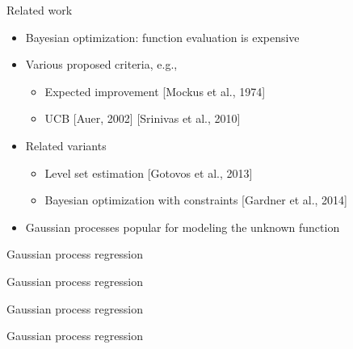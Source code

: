 \documentclass[xetex,10pt,mathserif]{beamer}
\newlength\figureheight
\newlength\figurewidth
\newcommand{\qcite}[1]{{\small\color{gray}[#1]}}
\begin{document}
\begin{frame}{Related work}
\begin{itemize}
  \item<1-> Bayesian optimization: function evaluation is expensive
  \vspace{2em}
  \item<2-> Various proposed criteria, e.g.,
    \vspace{0.5em}
    \begin{itemize}
      \item Expected improvement \qcite{Mockus et al., 1974}
      \vspace{0.5em}
      \item UCB \qcite{Auer, 2002} \qcite{Srinivas et al., 2010}
    \end{itemize}
  \vspace{2em}
  \item<3-> Related variants
    \vspace{0.5em}
    \begin{itemize}
      \item Level set estimation \qcite{Gotovos et al., 2013}
      \vspace{0.5em}
      \item Bayesian optimization with constraints \qcite{Gardner et al., 2014}
    \end{itemize}
  \vspace{2em}
  \item<4-> Gaussian processes popular for modeling the unknown function
\end{itemize}
\end{frame}

\begin{frame}{Gaussian process regression}
\centering
\setlength\figurewidth{5in}
\setlength\figureheight{3.5in}

\end{frame}

\begin{frame}{Gaussian process regression}
\centering
\setlength\figurewidth{5in}
\setlength\figureheight{3.5in}

\end{frame}

\begin{frame}{Gaussian process regression}
\centering
\setlength\figurewidth{5in}
\setlength\figureheight{3.5in}

\end{frame}

\begin{frame}{Gaussian process regression}
\centering
\setlength\figurewidth{5in}
\setlength\figureheight{3.5in}

\end{frame}
\end{document}
